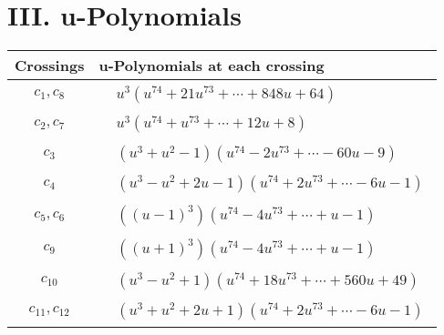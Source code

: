 \documentclass[1p]{elsarticle_modified}
\theoremstyle{definition}
\begin{document}
\newpage\renewcommand{\arraystretch}{1}
\centering \section*{ III. u-Polynomials}
\begin{tabular}{m{50pt}|m{274pt}}
Crossings & \hspace{64pt}u-Polynomials at each crossing \\
\hline $$\begin{aligned}c_{1},c_{8}\end{aligned}$$&$\begin{aligned}
&u^3(u^{74}+21 u^{73}+\cdots+848 u+64)
\end{aligned}$\\
\hline $$\begin{aligned}c_{2},c_{7}\end{aligned}$$&$\begin{aligned}
&u^3(u^{74}+u^{73}+\cdots+12 u+8)
\end{aligned}$\\
\hline $$\begin{aligned}c_{3}\end{aligned}$$&$\begin{aligned}
&(u^3+u^2-1)(u^{74}-2 u^{73}+\cdots-60 u-9)
\end{aligned}$\\
\hline $$\begin{aligned}c_{4}\end{aligned}$$&$\begin{aligned}
&(u^3- u^2+2 u-1)(u^{74}+2 u^{73}+\cdots-6 u-1)
\end{aligned}$\\
\hline $$\begin{aligned}c_{5},c_{6}\end{aligned}$$&$\begin{aligned}
&((u-1)^3)(u^{74}-4 u^{73}+\cdots+u-1)
\end{aligned}$\\
\hline $$\begin{aligned}c_{9}\end{aligned}$$&$\begin{aligned}
&((u+1)^3)(u^{74}-4 u^{73}+\cdots+u-1)
\end{aligned}$\\
\hline $$\begin{aligned}c_{10}\end{aligned}$$&$\begin{aligned}
&(u^3- u^2+1)(u^{74}+18 u^{73}+\cdots+560 u+49)
\end{aligned}$\\
\hline $$\begin{aligned}c_{11},c_{12}\end{aligned}$$&$\begin{aligned}
&(u^3+u^2+2 u+1)(u^{74}+2 u^{73}+\cdots-6 u-1)
\end{aligned}$\\
\hline
\end{tabular}\newpage\renewcommand{\arraystretch}{1}
\end{document}
